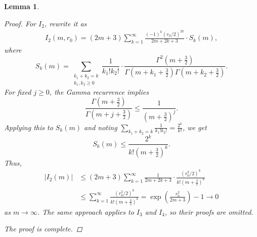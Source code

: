\documentclass[11pt,reqno,oneside]{amsart}
\numberwithin{equation}{section}
\newtheorem{lemma}[theorem]{Lemma}
\theoremstyle{definition}
\theoremstyle{remark}
\numberwithin{equation}{section}
\begin{document}
\begin{lemma}
\begin{proof}
			For $I_2$, rewrite it as
			\[
			\begin{aligned}
				I_2\left(m, r_0\right)=(2 m+3) \sum_{k=1}^{\infty} \frac{(-1)^k\left(r_0 / 2\right)^{2 k}}{2 m+2 k+3} \cdot S_k(m),
			\end{aligned}
			\]
			where 
			\[
			S_k(m)=\sum_{\substack{k_1+k_2=k \\ k_1, k_2 \geq 0}} \frac{1}{k_{1}!k_{2}!} \cdot \frac{\Gamma^2\left(m+\frac{3}{2}\right)}{\Gamma\left(m+k_1+\frac{3}{2}\right) \Gamma\left(m+k_2+\frac{3}{2}\right)}.
			\]
			For fixed $j \geq 0$, the Gamma recurrence implies
			\[
			\frac{\Gamma\left(m+\frac{3}{2}\right)}{\Gamma\left(m+j+\frac{3}{2}\right)} \leq \frac{1}{\left(m+\frac{3}{2}\right)^j}.
			\]
			Applying this to $S_k(m)$ and noting $\sum_{k_1+k_2=k} \frac{1}{k_{1}!k_{2}!}=\frac{2^k}{k!}$, we get
			\[
			S_k(m) \leq \frac{2^k}{k!\left(m+\frac{3}{2}\right)^k}.
			\]
			Thus,
			\begin{equation*}
				\begin{aligned}
					\left|I_2(m)\right| &\leq(2 m+3) \sum_{k=1}^{\infty} \frac{1}{2 m+2 k+3} \cdot \frac{\left( r_0^2 / 2\right)^k}{k!\left(m+\frac{3}{2}\right)^k}\\
					&\leqslant \sum_{k=1}^{\infty} \frac{\left( r_0^2 / 2\right)^k}{k!\left(m+\frac{3}{2}\right)^k}=\exp(\frac{ r_0^2}{2m+3})-1\rightarrow 0
				\end{aligned}
			\end{equation*}
			as $m \rightarrow \infty$. The same approach applies to $I_3$ and $I_4$, so their proofs are omitted.
			
			The proof is complete.
		\end{proof}
	\end{lemma}
	
\end{document}
